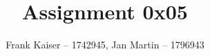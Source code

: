 \documentclass{article}
\begin{document}
	
	\title{Assignment 0x05}
	\author{Frank Kaiser -- 1742945, Jan Martin -- 1796943}
	
	\maketitle
	
	\tableofcontents
	
	
	
	
\end{document}
